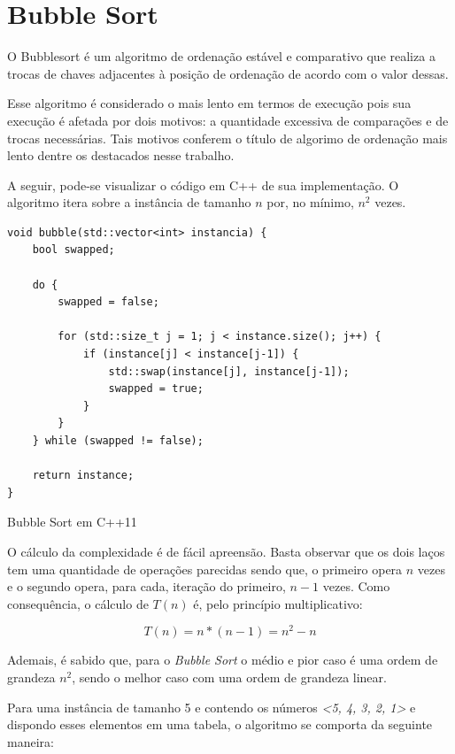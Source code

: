 \documentclass[a4paper, 12pt]{report}
\begin{document}
\section{Bubble Sort}
\label{sec-2-1-1}
O Bubblesort é um algoritmo de ordenação estável e comparativo que realiza a
trocas de chaves adjacentes à posição de ordenação de acordo com o valor
dessas.

Esse algoritmo é considerado o mais lento em termos de execução pois sua
execução é afetada por dois motivos: a quantidade excessiva de comparações e
de trocas necessárias. Tais motivos conferem o título de algorimo de ordenação
mais lento dentre os destacados nesse trabalho.

A seguir, pode-se visualizar o código em C++ de sua implementação. O algoritmo
itera sobre a instância de tamanho $n$ por, no mínimo, $n^2$ vezes.

\begin{listing}[H]
\begin{verbatim}
void bubble(std::vector<int> instancia) {
    bool swapped;

    do {
        swapped = false;

        for (std::size_t j = 1; j < instance.size(); j++) {
            if (instance[j] < instance[j-1]) {
                std::swap(instance[j], instance[j-1]);
                swapped = true;
            }
        }
    } while (swapped != false);

    return instance;
}
\end{verbatim}
\caption{Bubble Sort em C++11}
\end{listing}

O cálculo da complexidade é de fácil apreensão. Basta observar que os dois
laços tem uma quantidade de operações parecidas sendo que, o primeiro opera
$n$ vezes e o segundo opera, para cada, iteração do primeiro, $n-1$ vezes.
Como consequência, o cálculo de $T(n)$ é, pelo princípio multiplicativo:

\begin{displaymath}
T(n) = n * (n-1) = n^2 - n
\end{displaymath}

Ademais, é sabido que, para o \emph{Bubble Sort} o médio e pior caso é uma ordem de
grandeza $n^2$, sendo o melhor caso com uma ordem de grandeza linear.

Para uma instância de tamanho 5 e contendo os números \emph{<5, 4, 3, 2, 1>} e
dispondo esses elementos em uma tabela, o algoritmo se comporta da seguinte
maneira:
\end{document}
